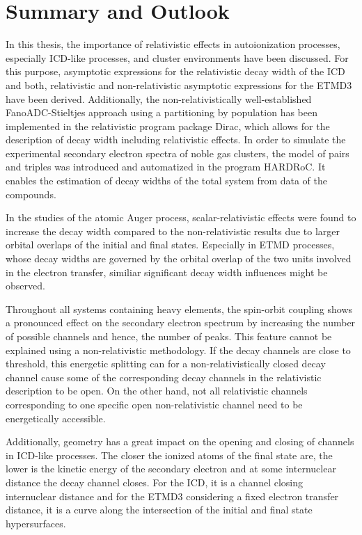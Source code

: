 \chapter{Summary and Outlook}

In this thesis, the importance of relativistic effects in autoionization
processes, especially \ac{ICD}-like
processes, and cluster environments have been discussed.
For this purpose, asymptotic expressions for the relativistic decay width of the ICD
and both, relativistic and non-relativistic asymptotic expressions for the ETMD3
have been derived. Additionally, the non-relativistically well-established
FanoADC-Stieltjes approach
using a partitioning by population has been implemented
in the relativistic program package Dirac,
which allows for the
description of decay width including relativistic effects.
In order to simulate the experimental secondary electron spectra of noble gas
clusters, the model of pairs and triples was introduced and automatized in the
program HARDRoC. It enables the estimation of
decay widths of the total system from data of the compounds.

In the studies of the atomic Auger process, scalar-relativistic effects were
found to increase the decay width compared to the non-relativistic results
due to larger orbital overlaps of the initial and final states. Especially
in ETMD processes, whose decay widths are governed by the orbital overlap
of the two units involved in the electron transfer, similiar significant
decay width influences might be observed.

Throughout all systems containing heavy elements, the spin-orbit coupling
shows a pronounced effect on the secondary electron spectrum by increasing the
number of possible channels and hence, the number of peaks. This feature cannot
be explained using a non-relativistic methodology.
If the decay channels are close to threshold, this energetic splitting
can for a non-relativistically closed decay channel cause some of the
corresponding decay channels in the relativistic description to be open. On
the other hand, not all relativistic channels corresponding to one specific
open non-relativistic channel need to be energetically accessible.

Additionally, geometry has a great impact on the opening and closing of channels
in \ac{ICD}-like processes. The closer the ionized atoms of the final state are,
the lower is the kinetic energy of the secondary electron and at some
internuclear distance the decay channel closes. For the ICD, it is a channel
closing internuclear distance and for the ETMD3 considering a fixed electron
transfer distance, it is a curve along the intersection of the initial and final
state hypersurfaces.

